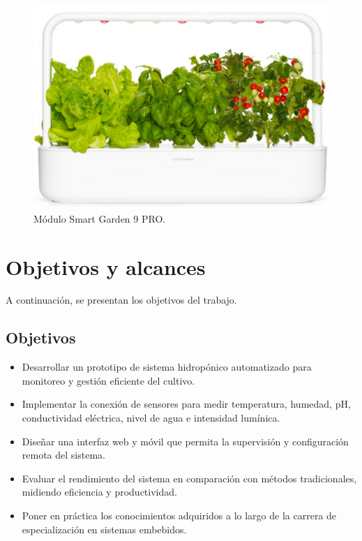 \begin{figure}[H]
	\centering
	\includegraphics[scale=.6]{./Figures/smart_garden.png}
	\caption{Módulo Smart Garden 9 PRO\protect\footnotemark.}
	\label{fig:smart_garden}
\end{figure}



\section{Objetivos y alcances}

A continuación, se presentan los objetivos del trabajo.

\subsection{Objetivos}
\begin{itemize}
    \item Desarrollar un prototipo de sistema hidropónico automatizado para monitoreo y gestión eficiente del cultivo.
    \item Implementar la conexión de sensores para medir temperatura, humedad, pH, conductividad eléctrica, nivel de agua e intensidad lumínica.
    \item Diseñar una interfaz web y móvil que permita la supervisión y configuración remota del sistema.
    \item Evaluar el rendimiento del sistema en comparación con métodos tradicionales, midiendo eficiencia y productividad.
    \item Poner en práctica los conocimientos adquiridos a lo largo de la carrera de especialización en sistemas embebidos.
\end{itemize}

